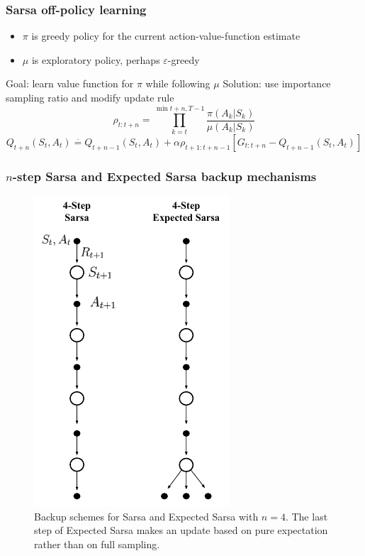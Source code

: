 \documentclass{beamer}
\begin{document}
\begin{frame}
  \frametitle{Sarsa off-policy learning}
  \begin{itemize}
    \item $\pi$ is greedy policy for the current action-value-function estimate
    \item $\mu$ is exploratory policy, perhaps $\varepsilon$-greedy
  \end{itemize}
  Goal: learn value function for $\pi$ while following $\mu$
  Solution: use importance sampling ratio and modify update rule
  $$\rho_{t : t + n} = \prod_{k = t}^{\min{t + n, T - 1}}
    \frac{\pi(A_k | S_k)}{\mu(A_k | S_k)}$$
  $$Q_{t + n}(S_t, A_t) \overset{\cdot}{=} Q_{t + n - 1}(S_t, A_t) +
    \alpha \rho_{t + 1 : t + n - 1} [G_{t : t + n} - Q_{t + n - 1}(S_t, A_t)]$$
\end{frame}

\begin{frame}
  \frametitle{$n$-step Sarsa and Expected Sarsa backup mechanisms}
  \begin{figure}
    \centering
    \includegraphics[height=0.6 \textheight]{sarsa_backup}
    \caption{Backup schemes for Sarsa and Expected Sarsa with $n = 4$. The last
      step of Expected Sarsa makes an update based on pure expectation rather
      than on full sampling.}
  \end{figure}
\end{frame}
\end{document}
